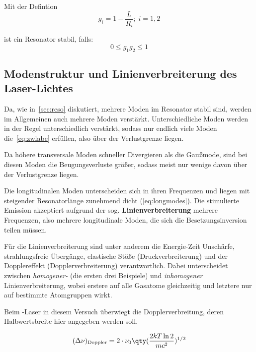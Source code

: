 \documentclass[slug=GL, room=HZDR\ Dresden/Rossendorf\,\ Geb.\ 620/123, supervisor=Tim\ Ziegler]{../../Lab_Report_LaTeX/lab_report}
\newcommand{\hne}{\ce{HeNe}-Laser}
\begin{document}
Mit der Defintion
\begin{equation}
  \label{eq:gparams}
  g_i=1-\frac{L}{R_i};\; i=1,2
\end{equation}

ist ein Resonator stabil, falls:
\begin{equation}
  \label{eq:stabbed}
  0\leq g_1g_2\leq 1
\end{equation}

\subsection{Modenstruktur und Linienverbreiterung des Laser-Lichtes}
\label{ref:linv}

Da, wie in~\ref{sec:reso} diskutiert, mehrere Moden im Resonator
stabil sind, werden im Allgemeinen auch mehrere Moden verst\"arkt.
Unterschiedliche Moden werden in der Regel unterschiedlich
verst\"arkt, sodass nur endlich viele Moden die~\ref{eq:zwlabe}
erf\"ullen, also \"uber der Verlustgrenze liegen.

Da h\"ohere transversale Moden schneller Divergieren als die
Gau\ss{}mode, sind bei diesen Moden die Beugungsverluste gr\"o\ss{}er,
sodass meist nur wenige davon \"uber der Verlustgrenze
liegen.~\cite[171]{Sigrist2018}

Die longitudinalen Moden unterscheiden sich in ihren Frequenzen und
liegen mit steigender Resonatorl\"ange zunehmend dicht
(\ref{eq:longmodes}). Die stimulierte Emission akzeptiert aufgrund der
sog. \textbf{Linienverbreiterung} mehrere Frequenzen, also mehrere
longitudinale Moden, die sich die Besetzungsinversion teilen m\"ussen.

F\"ur die Linienverbreiterung sind unter anderem die Energie-Zeit
Unsch\"arfe, strahlungsfreie \"Uberg\"ange, elastische St\"o\ss{}e
(Druckverbreiterung) und der Dopplereffekt (Dopplerverbreiterung)
verantwortlich. Dabei unterscheidet zwischen \textit{homogener-} (die
ersten drei Beispiele) und \textit{inhomogener} Linienverbreiterung,
wobei erstere auf alle Gasatome gleichzeitig und letztere nur auf
bestimmte Atomgruppen wirkt.

Beim \hne{} in diesem Versuch \"uberwiegt die Dopplerverbreitung,
deren Halbwertsbreite hier angegeben werden soll.

\begin{equation}
  \label{eq:doppler}
  (\Delta\nu)_{\text{Doppler}}=2\cdot \nu_0\qty(\frac{2kT\ln{2}}{mc^2})^{1/2}
\end{equation}
\end{document}
